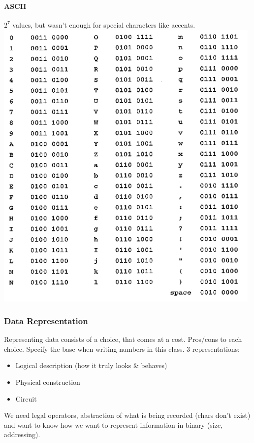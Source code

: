\documentclass[12 pt]{article}
\begin{document}
	\paragraph{ASCII} $2^7$ values, but wasn't enough for special characters like accents.\\ \includegraphics[scale=0.7]{basc}
	\subsubsection{Data Representation}
	Representing data consists of a choice, that comes at a cost. Pros/cons to each choice. Specify the base when writing numbers in this class. 3 representations:
	\begin{itemize}
		\item Logical description (how it truly looks \& behaves)
		\item Physical construction
		\item Circuit
	\end{itemize}
	We need legal operators, abstraction of what is being recorded (chars don't exist) and want to know how we want to represent information in binary (size, addressing).
\end{document}
